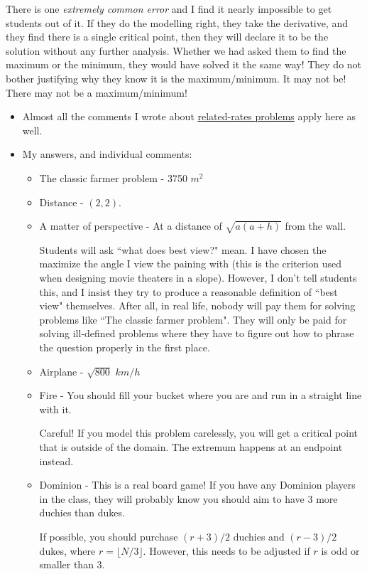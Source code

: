 \documentclass[11pt]{article}
\newcommand {\DS} [1] {${\displaystyle #1}$}
\newcommand{\nl}{\hfill \vspace{-1.1\baselineskip}} %
\begin{document}
\begin{warning}
There is one \emph{extremely common error} and I find it nearly impossible to get students out of it.  If they do the modelling right, they take the derivative, and they find there is a single critical point, then they will declare it to be the solution without any further analysis.  Whether we had asked them to find the maximum or the minimum, they would have solved it the same way!  They do not bother justifying why they know it is the maximum/minimum.  It may not be!  There may not be a maximum/minimum!
\end{warning}

\begin{comments}
\nl
	\begin{itemize}
		\item Almost all the comments I wrote about \hyperref[relatedrates]{related-rates problems} apply here as well. 
		\item My answers, and individual comments:
			\begin{itemize}
				\item The classic farmer problem - 3750 $m^2$
				\item Distance - $(2,2)$.
				\item A matter of perspective - At a distance of \DS{\sqrt{a(a+h)}} from the wall.
				
					Students will ask ``what does best view?" mean.  I have chosen the maximize the angle I view the paining with (this is the criterion used when designing movie theaters in a slope).  However, I don't tell students this, and I insist they try to produce a reasonable definition of ``best view" themselves.  After all, in real life, nobody will pay them for solving problems like ``The classic farmer problem".  They will only be paid for solving ill-defined problems where they have to figure out how to phrase the question properly in the first place.
				\item Airplane - \DS{\sqrt{800}} $km/h$
				\item Fire - You should fill your bucket where you are and run in a straight line with it.
				
					Careful! If you model this problem carelessly, you will get a critical point that is outside of the domain.  The extremum happens at an endpoint instead.
				\item Dominion - This is a real board game!  If you have any Dominion players in the class, they will probably know you should aim to have 3 more duchies than dukes.
				
				If possible, you should purchase $(r+3)/2$ duchies and $(r-3)/2$ dukes, where $r = \lfloor N/3 \rfloor$.   However, this needs to be adjusted if $r$ is odd or smaller than $3$.
			\end{itemize}
	\end{itemize}
\end{comments}
\end{document}
